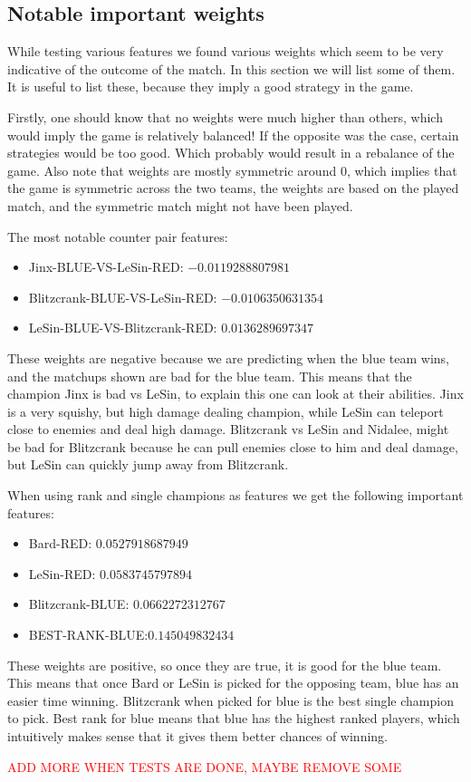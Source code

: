 \subsection{Notable important weights} %
\label{sub:important_weights}

While testing various features we found various weights which seem to be very indicative of the outcome of the match. In this section we will list some of them. It is useful to list these, because they imply a good strategy in the game.

Firstly, one should know that no weights were much higher than others, which would imply the game is relatively balanced! If the opposite was the case, certain strategies would be too good. Which probably would result in a rebalance of the game. Also note that weights are mostly symmetric around 0, which implies that the game is symmetric across the two teams, the weights are based on the played match, and the symmetric match might not have been played.

The most notable counter pair features:
\begin{itemize}
    \item Jinx-BLUE-VS-LeSin-RED: $-0.0119288807981$
    \item Blitzcrank-BLUE-VS-LeSin-RED: $-0.0106350631354$
    \item LeSin-BLUE-VS-Blitzcrank-RED: $0.0136289697347$
\end{itemize}
These weights are negative because we are predicting when the blue team wins, and the matchups shown are bad for the blue team. This means that the champion Jinx is bad vs LeSin, to explain this one can look at their abilities. Jinx is a very squishy, but high damage dealing champion, while LeSin can teleport close to enemies and deal high damage. Blitzcrank vs LeSin and Nidalee, might be bad for Blitzcrank because he can pull enemies close to him and deal damage, but LeSin can quickly jump away from Blitzcrank.

When using rank and single champions as features we get the following important features:

\begin{itemize}
    \item Bard-RED: $0.0527918687949$
    \item LeSin-RED: $0.0583745797894$
    \item Blitzcrank-BLUE: $0.0662272312767$
    \item BEST-RANK-BLUE:$ 0.145049832434$
\end{itemize}

These weights are positive, so once they are true, it is good for the blue team. This means that once Bard or LeSin is picked for the opposing team, blue has an easier time winning. Blitzcrank when picked for blue is the best single champion to pick. Best rank for blue means that blue has the highest ranked players, which intuitively makes sense that it gives them better chances of winning.

\textcolor{red}{ADD MORE WHEN TESTS ARE DONE, MAYBE REMOVE SOME}


